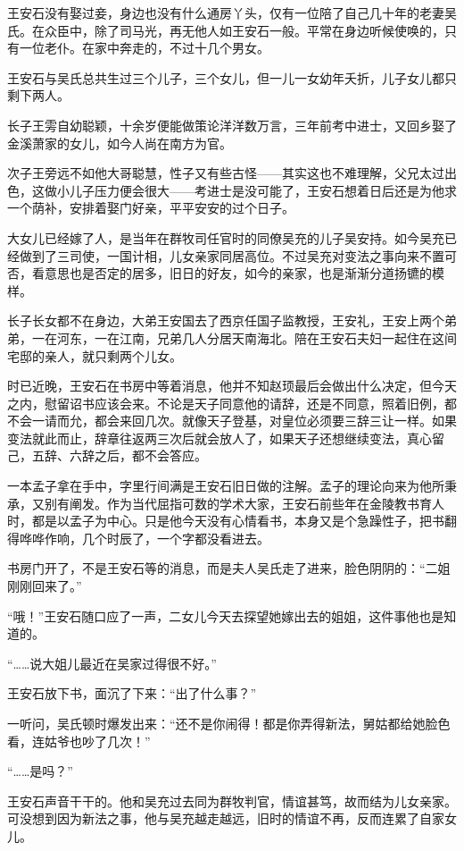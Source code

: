王安石没有娶过妾，身边也没有什么通房丫头，仅有一位陪了自己几十年的老妻吴氏。在众臣中，除了司马光，再无他人如王安石一般。平常在身边听候使唤的，只有一位老仆。在家中奔走的，不过十几个男女。

王安石与吴氏总共生过三个儿子，三个女儿，但一儿一女幼年夭折，儿子女儿都只剩下两人。

长子王雱自幼聪颖，十余岁便能做策论洋洋数万言，三年前考中进士，又回乡娶了金溪萧家的女儿，如今人尚在南方为官。

次子王旁远不如他大哥聪慧，性子又有些古怪——其实这也不难理解，父兄太过出色，这做小儿子压力便会很大——考进士是没可能了，王安石想着日后还是为他求一个荫补，安排着娶门好亲，平平安安的过个日子。

大女儿已经嫁了人，是当年在群牧司任官时的同僚吴充的儿子吴安持。如今吴充已经做到了三司使，一国计相，儿女亲家同居高位。不过吴充对变法之事向来不置可否，看意思也是否定的居多，旧日的好友，如今的亲家，也是渐渐分道扬镳的模样。

长子长女都不在身边，大弟王安国去了西京任国子监教授，王安礼，王安上两个弟弟，一在河东，一在江南，兄弟几人分居天南海北。陪在王安石夫妇一起住在这间宅邸的亲人，就只剩两个儿女。

时已近晚，王安石在书房中等着消息，他并不知赵顼最后会做出什么决定，但今天之内，慰留诏书应该会来。不论是天子同意他的请辞，还是不同意，照着旧例，都不会一请而允，都会来回几次。就像天子登基，对皇位必须要三辞三让一样。如果变法就此而止，辞章往返两三次后就会放人了，如果天子还想继续变法，真心留己，五辞、六辞之后，都不会答应。

一本孟子拿在手中，字里行间满是王安石旧日做的注解。孟子的理论向来为他所秉承，又别有阐发。作为当代屈指可数的学术大家，王安石前些年在金陵教书育人时，都是以孟子为中心。只是他今天没有心情看书，本身又是个急躁性子，把书翻得哗哗作响，几个时辰了，一个字都没看进去。

书房门开了，不是王安石等的消息，而是夫人吴氏走了进来，脸色阴阴的：“二姐刚刚回来了。”

“哦！”王安石随口应了一声，二女儿今天去探望她嫁出去的姐姐，这件事他也是知道的。

“……说大姐儿最近在吴家过得很不好。”

王安石放下书，面沉了下来：“出了什么事？”

一听问，吴氏顿时爆发出来：“还不是你闹得！都是你弄得新法，舅姑都给她脸色看，连姑爷也吵了几次！”

“……是吗？”

王安石声音干干的。他和吴充过去同为群牧判官，情谊甚笃，故而结为儿女亲家。可没想到因为新法之事，他与吴充越走越远，旧时的情谊不再，反而连累了自家女儿。

